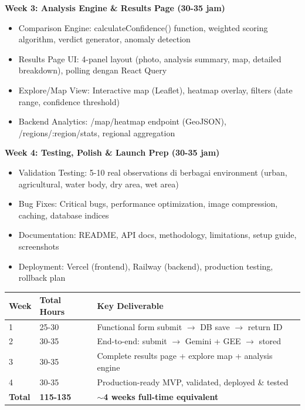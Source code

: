 \documentclass[12pt,a4paper]{article}
\begin{document}
\textbf{Week 3: Analysis Engine \& Results Page (30-35 jam)}
\begin{itemize}
  \item Comparison Engine: calculateConfidence() function, weighted scoring algorithm, verdict generator, anomaly detection
  \item Results Page UI: 4-panel layout (photo, analysis summary, map, detailed breakdown), polling dengan React Query
  \item Explore/Map View: Interactive map (Leaflet), heatmap overlay, filters (date range, confidence threshold)
  \item Backend Analytics: /map/heatmap endpoint (GeoJSON), /regions/:region/stats, regional aggregation
\end{itemize}

\textbf{Week 4: Testing, Polish \& Launch Prep (30-35 jam)}
\begin{itemize}
  \item Validation Testing: 5-10 real observations di berbagai environment (urban, agricultural, water body, dry area, wet area)
  \item Bug Fixes: Critical bugs, performance optimization, image compression, caching, database indices
  \item Documentation: README, API docs, methodology, limitations, setup guide, screenshots
  \item Deployment: Vercel (frontend), Railway (backend), production testing, rollback plan
\end{itemize}

\begin{tabularx}{\textwidth}{|l|l|X|}
  \hline
  \textbf{Week} & \textbf{Total Hours} & \textbf{Key Deliverable} \\
  \hline
  1 & 25-30 & Functional form submit $\rightarrow$ DB save $\rightarrow$ return ID \\
  2 & 30-35 & End-to-end: submit $\rightarrow$ Gemini + GEE $\rightarrow$ stored \\
  3 & 30-35 & Complete results page + explore map + analysis engine \\
  4 & 30-35 & Production-ready MVP, validated, deployed \& tested \\
  \textbf{Total} & \textbf{115-135} & \textbf{$\sim$4 weeks full-time equivalent} \\
  \hline
\end{tabularx}

\vspace{0.5cm}
\end{document}
